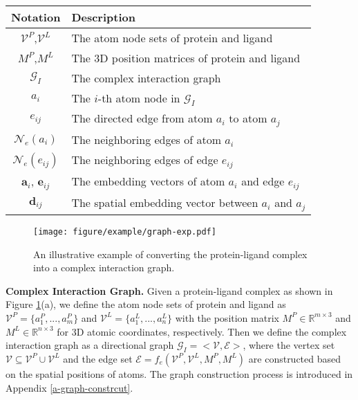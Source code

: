 \documentclass[sigconf]{acmart}
\newcommand{\B}[1]{{\bfseries #1}}
\newcommand{\graph}{\ensuremath{\mathcal{G}_I}}
\newcommand{\proteinV}{\ensuremath{\mathcal{V}^P}}
\newcommand{\ligandV}{\ensuremath{\mathcal{V}^L}}
\newcommand{\proteinM}{\ensuremath{M^P}}
\newcommand{\ligandM}{\ensuremath{M^L}}
\newcommand{\mycaption}[1]{\caption{\normalfont{#1}}}
\begin{document}
\begin{table}[t]
	\mycaption{Mathematical notations.
	}
	\vspace{-3ex}
	\label{table-symbol}
	\begin{tabular}{cl}
		\toprule
Notation	&	Description	\\
		\midrule
\proteinV,\ligandV	& The atom node sets of protein and ligand \\
		\proteinM,\ligandM	& The 3D position matrices of protein and ligand \\
		\graph	& The complex interaction graph	\\
		$a_i$	& The $i$-th atom node in \graph \\
		$e_{ij}$ & The directed edge from atom $a_i$ to atom $a_j$ \\
		$\mathcal{N}_{e}(a_i)$ & The neighboring edges of atom $a_i$ \\
		$\mathcal{N}_{e}(e_{ij})$ & The neighboring edges of edge $e_{ij}$ \\
		$\bm{a}_{i}$, $\bm{e}_{ij}$ & The embedding vectors of atom $a_i$ and edge $e_{ij}$  \\
		$\bm{d}_{ij}$ & The spatial embedding vector between $a_i$ and $a_j$ \\
\bottomrule
        
	\end{tabular}
	\vspace{-3ex}
\end{table}

 
\begin{figure}[t]
\centering
\texttt{[image: figure/example/graph-exp.pdf]}
\vspace{-4mm}
\caption{An illustrative example of converting the protein-ligand complex into a complex interaction graph.}
\label{fig-graph}
\vspace{-4mm}
\end{figure}

\begin{definition}
\B{Complex Interaction Graph.}
Given a protein-ligand complex as shown in Figure \ref{fig-graph}(a), we define the atom node sets of protein and ligand as $\proteinV=\{a^P_1,...,a^P_m\}$ and $\ligandV=\{a^L_1,...,a^L_n\}$ with the position matrix $\proteinM \in \mathbb{R}^{m \times 3}$ and $\ligandM \in \mathbb{R}^{n \times 3}$ for 3D atomic coordinates, respectively. Then we define the complex interaction graph as a directional graph $\graph=<\mathcal{V},\mathcal{E}>$, where the vertex set $\mathcal{V} \subseteq \proteinV \cup \ligandV$ and the edge set $\mathcal{E}=f_e(\proteinV, \ligandV, \proteinM, \ligandM)$ are constructed based on the spatial positions of atoms. The graph construction process is introduced in Appendix \ref{a-graph-constrcut}.




\end{definition}
\end{document}
